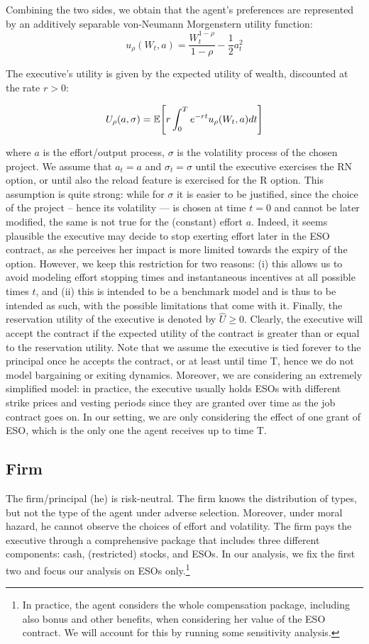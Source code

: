 Combining the two sides, we obtain that the agent's preferences are represented by an additively separable von-Neumann Morgenstern utility function:
$$ u_\rho (W_t, a) = \frac{W_t^{1-\rho}}{1-\rho} - \frac{1}{2}a_t^2 $$

The executive's utility is given by the expected utility of wealth, discounted at the rate $r>0$:

$$ U_\rho (a, \sigma) = \operatorname{\mathbb{E}} \Biggl[r \int_{0}^{T} e^{-rt} u_\rho (W_t, a) dt \Biggr]$$

where $a$ is the effort/output process, $\sigma$ is the volatility process of the chosen project. We assume that $a_t=a$ and $\sigma_t=\sigma$ until the executive exercises the RN option, or until also the reload feature is exercised for the R option. This assumption is quite strong: while for $\sigma$ it is easier to be justified, since the choice of the project -- hence its volatility --- is chosen at time $t=0$ and cannot be later modified, the same is not true for the (constant) effort $a$. Indeed, it seems plausible the executive may decide to stop exerting effort later in the ESO contract, as she perceives her impact is more limited towards the expiry of the option. However, we keep this restriction for two reasons: (i) this allows us to avoid modeling effort stopping times and instantaneous incentives at all possible times $t$, and (ii) this is intended to be a benchmark model and is thus to be intended as such, with the possible limitations that come with it. Finally, the reservation utility of the executive is denoted by $\hat{U} \ge 0$. Clearly, the executive will accept the contract if the expected utility of the contract is greater than or equal to the reservation utility.
Note that we assume the executive is tied forever to the principal once he accepts the contract, or at least until time T, hence we do not model bargaining or exiting dynamics. Moreover, we are considering an extremely simplified model: in practice, the executive usually holds ESOs with different strike prices and vesting periods since they are granted over time as the job contract goes on. In our setting, we are only considering the effect of one grant of ESO, which is the only one the agent receives up to time T. 

\subsection{Firm}
The firm/principal (he) is risk-neutral. The firm knows the distribution of types, but not the type of the agent under adverse selection. Moreover, under moral hazard, he cannot observe the choices of effort and volatility. 
The firm pays the executive through a comprehensive package that includes three different components: cash, (restricted) stocks, and ESOs. In our analysis, we fix the first two and focus our analysis on ESOs only.\footnote{In practice, the agent considers the whole compensation package, including also bonus and other benefits, when considering her value of the ESO contract. We will account for this by running some sensitivity analysis.} 


